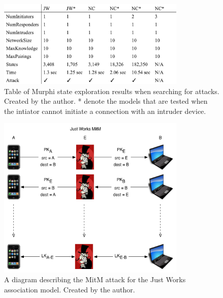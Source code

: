 \documentclass{acm_proc_article-sp}
\begin{document}
\begin{figure}
    \begin{center}
        \includegraphics[width=0.8\textwidth]{diagrams/state_table.png}
        \caption{Table of Murphi state exploration results when searching for attacks. Created by the author. * denote the models that are tested when the intiator cannot initiate a connection with an intruder device.}
        \label{state_table}
    \end{center}
\end{figure}

\begin{figure}
    \begin{center}
        \includegraphics[width=0.8\textwidth]{diagrams/jw_mitm.png}
        \caption{A diagram describing the MitM attack for the Just Works association model. Created by the author.}
        \label{jw_mitm}
    \end{center}
\end{figure}
\end{document}
